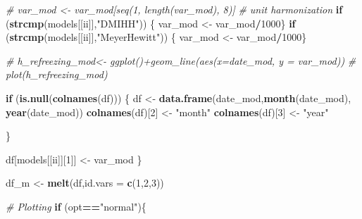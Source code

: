 \documentclass[]{article}
\newenvironment{Shaded}{\begin{snugshade}}{\end{snugshade}}
\newcommand{\CommentTok}[1]{\textcolor[rgb]{0.56,0.35,0.01}{\textit{#1}}}
\newcommand{\ControlFlowTok}[1]{\textcolor[rgb]{0.13,0.29,0.53}{\textbf{#1}}}
\newcommand{\DataTypeTok}[1]{\textcolor[rgb]{0.13,0.29,0.53}{#1}}
\newcommand{\DecValTok}[1]{\textcolor[rgb]{0.00,0.00,0.81}{#1}}
\newcommand{\KeywordTok}[1]{\textcolor[rgb]{0.13,0.29,0.53}{\textbf{#1}}}
\newcommand{\NormalTok}[1]{#1}
\newcommand{\OperatorTok}[1]{\textcolor[rgb]{0.81,0.36,0.00}{\textbf{#1}}}
\newcommand{\StringTok}[1]{\textcolor[rgb]{0.31,0.60,0.02}{#1}}
\begin{document}
\begin{Shaded}
\begin{Highlighting}[]
  \CommentTok{# var_mod <- var_mod[seq(1, length(var_mod), 8)]}
  \CommentTok{# unit harmonization}
  \ControlFlowTok{if}\NormalTok{ (}\KeywordTok{strcmp}\NormalTok{(models[[ii]],}\StringTok{"DMIHH"}\NormalTok{)) \{}
\NormalTok{    var_mod <-}\StringTok{ }\NormalTok{var_mod}\OperatorTok{/}\DecValTok{1000}\NormalTok{\}}
    \ControlFlowTok{if}\NormalTok{ (}\KeywordTok{strcmp}\NormalTok{(models[[ii]],}\StringTok{"MeyerHewitt"}\NormalTok{)) \{}
\NormalTok{    var_mod <-}\StringTok{ }\NormalTok{var_mod}\OperatorTok{/}\DecValTok{1000}\NormalTok{\}}
  
  \CommentTok{# h_refreezing_mod<- ggplot()+geom_line(aes(x=date_mod, y = var_mod))}
  \CommentTok{# plot(h_refreezing_mod)}
  
  \ControlFlowTok{if}\NormalTok{ (}\KeywordTok{is.null}\NormalTok{(}\KeywordTok{colnames}\NormalTok{(df))) \{}
\NormalTok{    df <-}\StringTok{ }\KeywordTok{data.frame}\NormalTok{(date_mod,}\KeywordTok{month}\NormalTok{(date_mod), }\KeywordTok{year}\NormalTok{(date_mod))}
      \KeywordTok{colnames}\NormalTok{(df)[}\DecValTok{2}\NormalTok{] <-}\StringTok{ "month"}
      \KeywordTok{colnames}\NormalTok{(df)[}\DecValTok{3}\NormalTok{] <-}\StringTok{ "year"}

\NormalTok{  \} }

\NormalTok{  df[models[[ii]][}\DecValTok{1}\NormalTok{]] <-}\StringTok{ }\NormalTok{var_mod}
\NormalTok{  \}}
  
\NormalTok{  df_m <-}\StringTok{ }\KeywordTok{melt}\NormalTok{(df,}\DataTypeTok{id.vars =} \KeywordTok{c}\NormalTok{(}\DecValTok{1}\NormalTok{,}\DecValTok{2}\NormalTok{,}\DecValTok{3}\NormalTok{))}
  
                
\CommentTok{# Plotting}
\ControlFlowTok{if}\NormalTok{ (opt}\OperatorTok{==}\StringTok{"normal"}\NormalTok{)\{}
  

\end{Highlighting}
\end{Shaded}
\end{document}
